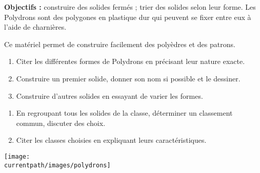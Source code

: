 \begin{activite}
    \begin{changemargin}{-10mm}{-15mm}
        {\bf Objectifs :} construire des solides fermés ; trier des solides selon leur forme.
           Les Polydrons sont des polygones en plastique dur qui peuvent se fixer entre eux à l'aide de charnières.
           
           Ce matériel permet de construire facilement des polyèdres et des patrons.
              \begin{enumerate}
                 \item Citer les différentes formes de Polydrons en précisant leur nature exacte.
                    
                 \vspace*{10mm}
                 \item Construire un premier solide, donner son nom si possible et le dessiner.
                 
                 \vspace*{35mm}
                 \item Construire d'autres solides en essayant de varier les formes.
              \end{enumerate}       
            \begin{enumerate}
               \item En regroupant tous les solides de la classe, déterminer un classement commun, discuter des choix.
               \item Citer les classes choisies en expliquant leurs caractéristiques.
               
                \vspace*{25mm}
            \end{enumerate}
         \begin{center}
              \texttt{[image: \\currentpath/images/polydrons]} \\
           \end{center}
    \end{changemargin}
\end{activite}